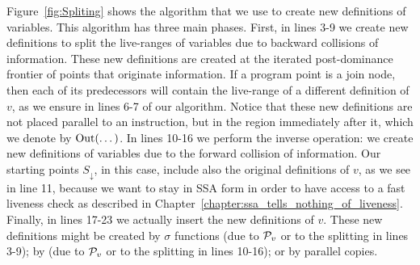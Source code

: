 {Figure~\ref{fig:Spliting} shows the algorithm that we use to create new
definitions of variables.
This algorithm has three main phases.
First, in lines 3-9 we create new definitions to split the live-ranges
of variables due to backward collisions of information.
These new definitions are created at the iterated post-dominance
frontier of points that originate information.
If a program point is a join node, then each of its predecessors
will contain the live-range of a different definition of $v$, as we ensure
in lines 6-7 of our algorithm.
Notice that these new definitions are not placed parallel to an instruction,
but in the region immediately after it, which we denote by $\textrm{Out}(\dots)$.
In lines 10-16 we perform the inverse operation: we create new definitions of
variables due to the forward collision of information.
Our starting points $S_\downarrow$, in this case, include also the original definitions of
$v$, as we see in line 11, because we want to stay in SSA form in order to
have access to a fast liveness check as described in Chapter~\ref{chapter:ssa_tells_nothing_of_liveness}.
Finally, in lines 17-23 we actually insert the new definitions of $v$.
These new definitions might be created by $\sigma$ functions (due to ${\cal P}_v$ or
to the splitting in lines 3-9); by \phifuns (due to ${\cal P}_v$ or to the
splitting in lines 10-16); or by parallel copies.

}
